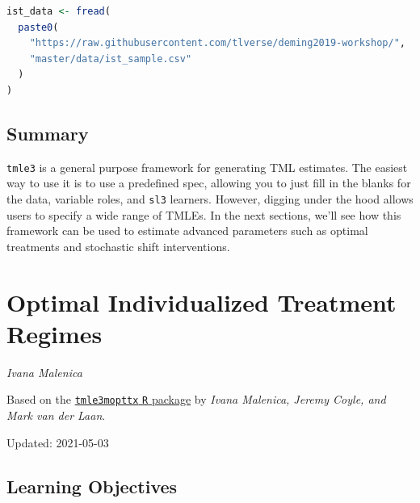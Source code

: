 \documentclass[12pt, krantz2,]{krantz}
\newcommand{\passthrough}[1]{#1}
\theoremstyle{definition}
\theoremstyle{definition}
\theoremstyle{definition}
\newcommand{\1}{\mathbbm{1}}
\begin{document}
\begin{lstlisting}[language=R]
ist_data <- fread(
  paste0(
    "https://raw.githubusercontent.com/tlverse/deming2019-workshop/",
    "master/data/ist_sample.csv"
  )
)
\end{lstlisting}

\hypertarget{summary}{%
\section{Summary}\label{summary}}

\passthrough{\lstinline!tmle3!} is a general purpose framework for generating TML estimates. The easiest
way to use it is to use a predefined spec, allowing you to just fill in the
blanks for the data, variable roles, and \passthrough{\lstinline!sl3!} learners. However, digging under
the hood allows users to specify a wide range of TMLEs. In the next sections,
we'll see how this framework can be used to estimate advanced parameters such as
optimal treatments and stochastic shift interventions.

\hypertarget{optimal-individualized-treatment-regimes}{%
\chapter{Optimal Individualized Treatment Regimes}\label{optimal-individualized-treatment-regimes}}

\emph{Ivana Malenica}

Based on the \href{https://github.com/tlverse/tmle3mopttx}{\passthrough{\lstinline!tmle3mopttx!} \passthrough{\lstinline!R!} package}
by \emph{Ivana Malenica, Jeremy Coyle, and Mark van der Laan}.

Updated: 2021-05-03

\hypertarget{learning-objectives-3}{%
\section{Learning Objectives}\label{learning-objectives-3}}
\end{document}
